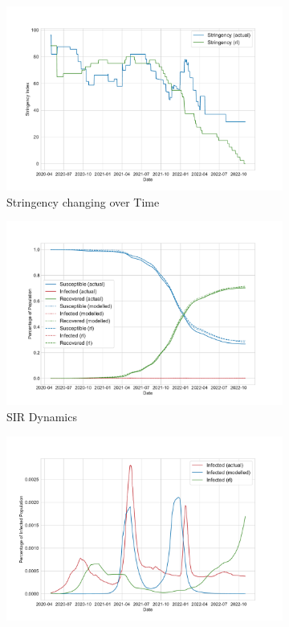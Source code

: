 \documentclass[tikz,fleqn,12pt]{wlscirep}
\begin{document}
\begin{figure}[htbp!]
  \centering
  \begin{subfigure}[t]{0.48\textwidth}
    \centering
    \includegraphics[width=\linewidth]{images/176647/rl_stringency.pdf}
    \caption{Stringency changing over Time}
    \label{fig:176647_rl_stringency}
  \end{subfigure}
  \hfill
  \begin{subfigure}[t]{0.48\textwidth}
    \centering
    \includegraphics[width=\linewidth]{images/176647/rl_sir.pdf}
    \caption{SIR Dynamics}
    \label{fig:176647_rl_sir}
  \end{subfigure}
  \hfill
  \begin{subfigure}[t]{0.48\textwidth}
    \centering
    \includegraphics[width=\linewidth]{images/176647/rl_i.pdf}

\end{subfigure}
\end{figure}
\end{document}
